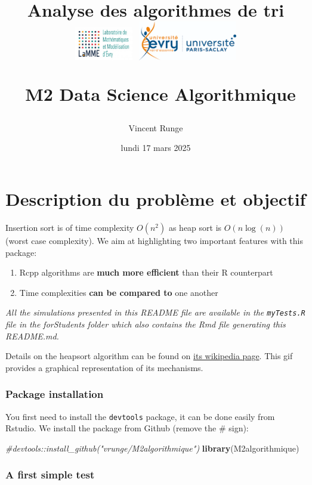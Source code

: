 \documentclass[
]{article}
\title{Analyse des algorithmes de tri\\
\includegraphics[width=1in,height=\textheight]{Images/logo_lamme.png}
\includegraphics[width=1.7in,height=\textheight]{Images/logo_UEVE.png}\\
\strut ~M2 Data Science Algorithmique}
\author{Vincent Runge}
\date{lundi 17 mars 2025}
\newenvironment{Shaded}{\begin{snugshade}}{\end{snugshade}}
\newcommand{\CommentTok}[1]{\textcolor[rgb]{0.56,0.35,0.01}{\textit{#1}}}
\newcommand{\FunctionTok}[1]{\textcolor[rgb]{0.13,0.29,0.53}{\textbf{#1}}}
\newcommand{\NormalTok}[1]{#1}
\providecommand{\tightlist}{%
  \setlength{\itemsep}{0pt}\setlength{\parskip}{0pt}}
\begin{document}
\maketitle

{
\hypersetup{linkcolor=}
\setcounter{tocdepth}{2}
\tableofcontents
}
\noindent\hrulefill

\section{Description du problème et
objectif}\label{description-du-probluxe8me-et-objectif}

Insertion sort is of time complexity \textbf{\(O(n^2)\)} as heap sort is
\textbf{\(O(n\log(n))\)} (worst case complexity). We aim at highlighting
two important features with this package:

\begin{enumerate}
\def\labelenumi{\arabic{enumi}.}
\tightlist
\item
  Rcpp algorithms are \textbf{much more efficient} than their R
  counterpart
\item
  Time complexities \textbf{can be compared to} one another
\end{enumerate}

\emph{All the simulations presented in this README file are available in
the \texttt{myTests.R} file in the forStudents folder which also
contains the Rmd file generating this README.md.}

Details on the heapsort algorithm can be found on
\href{https://en.wikipedia.org/wiki/Heapsort}{its wikipedia page}. This
gif provides a graphical representation of its mechanisms.

\subsubsection{Package installation}\label{package-installation}

You first need to install the \texttt{devtools} package, it can be done
easily from Rstudio. We install the package from Github (remove the \#
sign):

\begin{Shaded}
\begin{Highlighting}[]
\CommentTok{\#devtools::install\_github("vrunge/M2algorithmique")}
\FunctionTok{library}\NormalTok{(M2algorithmique)}
\end{Highlighting}
\end{Shaded}

\subsubsection{A first simple test}\label{a-first-simple-test}
\end{document}
